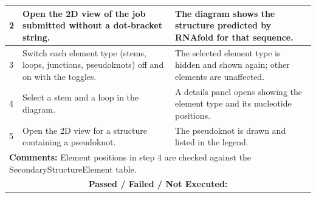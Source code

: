 \documentclass{FastFyp}
\begin{document}
{\begin{longtable}{|p{2.4cm}|p{4.6cm}|p{2.4cm}|p{3.8cm}|}
2 & Open the 2D view of the job submitted without a dot-bracket string. & \multicolumn{2}{p{6.64cm}|}{The diagram shows the structure predicted by RNAfold for that sequence.} \\ \hline
3 & Switch each element type (stems, loops, junctions, pseudoknots) off and on with the toggles. & \multicolumn{2}{p{6.64cm}|}{The selected element type is hidden and shown again; other elements are unaffected.} \\ \hline
4 & Select a stem and a loop in the diagram. & \multicolumn{2}{p{6.64cm}|}{A details panel opens showing the element type and its nucleotide positions.} \\ \hline
5 & Open the 2D view for a structure containing a pseudoknot. & \multicolumn{2}{p{6.64cm}|}{The pseudoknot is drawn and listed in the legend.} \\ \hline
\multicolumn{4}{|p{14.51cm}|}{\textbf{Comments:} Element positions in step 4 are checked against the SecondaryStructureElement table.} \\ \hline
\multicolumn{4}{|c|}{\textbf{Passed / Failed / Not Executed:}} \\ \hline
\end{longtable}
}
\end{document}
